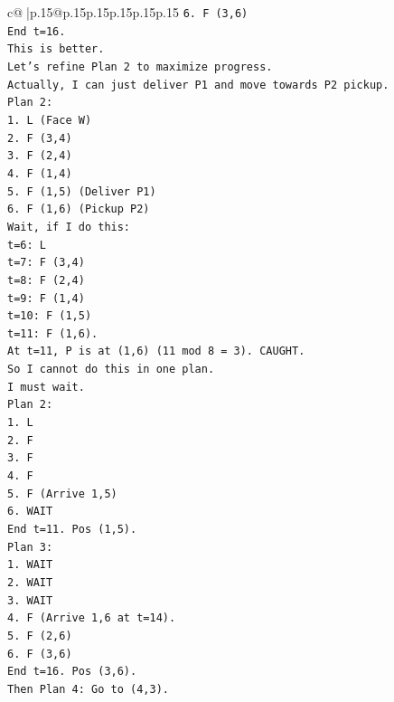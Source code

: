 \documentclass{article}
\begin{document}
{\begin{supertabular}{c@{$\;$}|p{.15\linewidth}@{}p{.15\linewidth}p{.15\linewidth}p{.15\linewidth}p{.15\linewidth}p{.15\linewidth}}
{{{\texttt{6. F (3,6)} \\
\texttt{End t=16.} \\
\texttt{This is better.} \\
\texttt{Let's refine Plan 2 to maximize progress.} \\
\texttt{Actually, I can just deliver P1 and move towards P2 pickup.} \\
\texttt{Plan 2:} \\
\texttt{1. L (Face W)} \\
\texttt{2. F (3,4)} \\
\texttt{3. F (2,4)} \\
\texttt{4. F (1,4)} \\
\texttt{5. F (1,5) (Deliver P1)} \\
\texttt{6. F (1,6) (Pickup P2)} \\
\texttt{Wait, if I do this:} \\
\texttt{t=6: L} \\
\texttt{t=7: F (3,4)} \\
\texttt{t=8: F (2,4)} \\
\texttt{t=9: F (1,4)} \\
\texttt{t=10: F (1,5)} \\
\texttt{t=11: F (1,6).} \\
\texttt{At t=11, P is at (1,6) (11 mod 8 = 3). CAUGHT.} \\
\texttt{So I cannot do this in one plan.} \\
\texttt{I must wait.} \\
\texttt{Plan 2:} \\
\texttt{1. L} \\
\texttt{2. F} \\
\texttt{3. F} \\
\texttt{4. F} \\
\texttt{5. F (Arrive 1,5)} \\
\texttt{6. WAIT} \\
\texttt{End t=11. Pos (1,5).} \\
\texttt{Plan 3:} \\
\texttt{1. WAIT} \\
\texttt{2. WAIT} \\
\texttt{3. WAIT} \\
\texttt{4. F (Arrive 1,6 at t=14).} \\
\texttt{5. F (2,6)} \\
\texttt{6. F (3,6)} \\
\texttt{End t=16. Pos (3,6).} \\
\texttt{Then Plan 4: Go to (4,3).} \\
}}}
\end{supertabular}}
\end{document}
